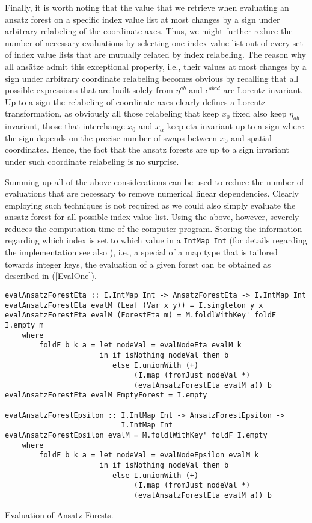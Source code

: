 Finally, it is worth noting that the value that we retrieve when evaluating an ansatz forest on a specific index value list at most changes by a sign under arbitrary relabeling of the coordinate axes. Thus, we might further reduce the number of necessary evaluations by selecting one index value list out of every set of index value lists that are mutually related by index relabeling. The reason why all ansätze admit this exceptional property, i.e., their values at most changes by a sign under arbitrary coordinate relabeling becomes obvious by recalling that all possible expressions that are built solely from $\eta^{ab}$ and $\epsilon^{abcd}$ are Lorentz invariant. Up to a sign the relabeling of coordinate axes clearly defines a Lorentz transformation, as obviously all those relabeling that keep $x_0$ fixed also keep $\eta_{ab}$ invariant, those that interchange $x_0$ and $x_{\alpha}$ keep eta invariant up to a sign where the sign depends on the precise number of swaps between $x_0$ and spatial coordinates. Hence, the fact that the ansatz forests are up to a sign invariant under such coordinate relabeling is no surprise. 

Summing up all of the above considerations can be used to reduce the number of evaluations that are necessary to remove numerical linear dependencies. Clearly employing such techniques is not required as we could also simply evaluate the ansatz forest for all possible index value list. Using the above, however, severely reduces the computation time of the computer program. 
Storing the information regarding which index is set to which value in a \texttt{IntMap Int} \cite{HackageIntMap} (for details regarding the implementation see also \cite{Okasaki98fastmergeable}), i.e., a special of a map type that is tailored towards integer keys, the evaluation of a given forest can be obtained as described in (\ref{EvalOne}).
\begin{listing}[hbt!]
\begin{verbatim}
evalAnsatzForestEta :: I.IntMap Int -> AnsatzForestEta -> I.IntMap Int
evalAnsatzForestEta evalM (Leaf (Var x y)) = I.singleton y x
evalAnsatzForestEta evalM (ForestEta m) = M.foldlWithKey' foldF I.empty m
    where
        foldF b k a = let nodeVal = evalNodeEta evalM k
                      in if isNothing nodeVal then b
                         else I.unionWith (+)
                              (I.map (fromJust nodeVal *)
                              (evalAnsatzForestEta evalM a)) b
evalAnsatzForestEta evalM EmptyForest = I.empty

evalAnsatzForestEpsilon :: I.IntMap Int -> AnsatzForestEpsilon ->
                           I.IntMap Int
evalAnsatzForestEpsilon evalM = M.foldlWithKey' foldF I.empty
    where
        foldF b k a = let nodeVal = evalNodeEpsilon evalM k
                      in if isNothing nodeVal then b
                         else I.unionWith (+) 
                              (I.map (fromJust nodeVal *)
                              (evalAnsatzForestEta evalM a)) b  
\end{verbatim} 
\caption{Evaluation of Ansatz Forests.}\label{EvalOne}
\end{listing}

